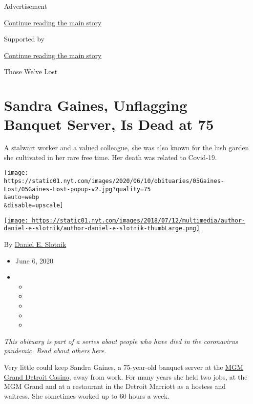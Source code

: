 Advertisement

\protect\hyperlink{after-top}{Continue reading the main story}

Supported by

\protect\hyperlink{after-sponsor}{Continue reading the main story}

Those We've Lost

\hypertarget{sandra-gaines-unflagging-banquet-server-is-dead-at-75}{%
\section{Sandra Gaines, Unflagging Banquet Server, Is Dead at
75}\label{sandra-gaines-unflagging-banquet-server-is-dead-at-75}}

A stalwart worker and a valued colleague, she was also known for the
lush garden she cultivated in her rare free time. Her death was related
to Covid-19.

\texttt{[image: https://static01.nyt.com/images/2020/06/10/obituaries/05Gaines-Lost/05Gaines-Lost-popup-v2.jpg?quality=75\\\&auto=webp\\\&disable=upscale]}

\href{https://www.nytimes.com/by/daniel-e-slotnik}{\texttt{[image: https://static01.nyt.com/images/2018/07/12/multimedia/author-daniel-e-slotnik/author-daniel-e-slotnik-thumbLarge.png]}}

By \href{https://www.nytimes.com/by/daniel-e-slotnik}{Daniel E. Slotnik}

\begin{itemize}
\item
  June 6, 2020
\item
  \begin{itemize}
  \item
  \item
  \item
  \item
  \item
  \end{itemize}
\end{itemize}

\emph{This obituary is part of a series about people who have died in
the coronavirus pandemic. Read about others}
\href{https://www.nytimes.com/interactive/2020/obituaries/people-died-coronavirus-obituaries.html}{\emph{here}}\emph{.}

Very little could keep Sandra Gaines, a 75-year-old banquet server at
the \href{https://mgmgranddetroit.mgmresorts.com/en/casino.html}{MGM
Grand Detroit Casino}, away from work. For many years she held two jobs,
at the MGM Grand and at a restaurant in the Detroit Marriott as a
hostess and waitress. She sometimes worked up to 60 hours a week.

